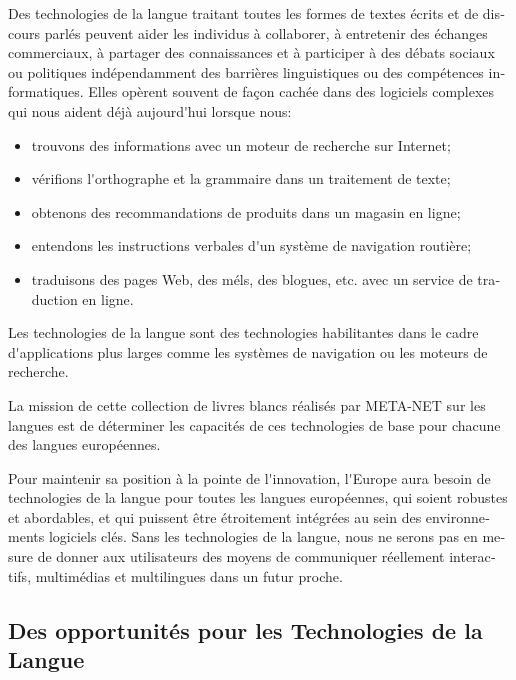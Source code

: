 \begin{french}
\begin{multicols}{2}
Des technologies de la langue traitant toutes les formes de textes
écrits et de discours parlés peuvent aider les individus à collaborer,
à entretenir des échanges commerciaux, à partager des connaissances et
à participer à des débats sociaux ou politiques indépendamment des
barrières linguistiques ou des compétences informatiques. Elles
opèrent souvent de façon cachée dans des logiciels complexes qui nous
aident déjà aujourd{\mbox '}hui lorsque nous:
\begin{itemize}
\item trouvons des informations avec un moteur de recherche sur
  Internet;
\item vérifions l{\mbox '}orthographe et la grammaire dans un
  traitement de texte;
\item obtenons des recommandations de produits dans un magasin en
  ligne;
\item entendons les instructions verbales d{\mbox '}un système de
  navigation routière;
\item traduisons des pages Web, des méls, des blogues, etc. avec un service de traduction en ligne.
\end{itemize}
Les technologies de la langue sont des technologies habilitantes dans
le cadre d{\mbox '}applications plus larges comme les systèmes de
navigation ou les moteurs de recherche. 



La mission de cette collection
de livres blancs réalisés par META-NET sur les langues est de
déterminer les capacités de ces technologies de base pour chacune des
langues européennes.


Pour maintenir sa position à la pointe de l{\mbox '}innovation,
l{\mbox '}Europe aura besoin de technologies de la langue pour toutes
les langues européennes, qui soient robustes et abordables, et qui
puissent être étroitement intégrées au sein des environnements
logiciels clés. Sans les technologies de la langue, nous ne serons pas
en mesure de donner aux utilisateurs des moyens de communiquer
réellement interactifs, multimédias et multilingues dans un futur
proche.

\subsection{Des opportunités pour les Technologies de la Langue}


\end{multicols}
\end{french}

